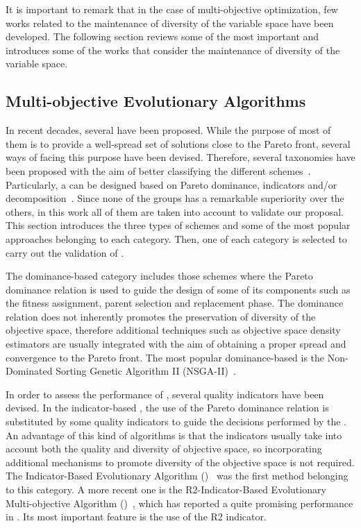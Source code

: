 It is important to remark that in the case of multi-objective optimization, few works related to the maintenance of 
diversity of the variable space have been developed.
%
The following section reviews some of the most important \MOEAS{} and introduces some of the works that consider
the maintenance of diversity of the variable space.

\subsection{Multi-objective Evolutionary Algorithms}

In recent decades, several \MOEAS{} have been proposed. 
%
While the purpose of most of them is to provide a well-spread set of solutions close to the Pareto front,
several ways of facing this purpose have been devised.
%
Therefore, several taxonomies have been proposed with the aim of better classifying the different 
schemes~\cite{Joel:BOOK_MOEAs}.
%
Particularly, a \MOEA{} can be designed based on Pareto dominance, indicators and/or decomposition~\cite{Joel:StateArt}.
%
Since none of the groups has a remarkable superiority over the others, in this work all of them are taken into account to validate
our proposal.
%
This section introduces the three types of schemes and some of the most popular approaches belonging to each category.
%
Then, one \MOEA{} of each category is selected to carry out the validation of \VSDMOEA{}.

The dominance-based category includes those schemes where the Pareto dominance relation is used to guide the 
design of some of its components such as the fitness assignment, parent selection and replacement phase.
%
The dominance relation does not inherently promotes the preservation of diversity of the objective space, 
therefore additional techniques such as objective space density estimators are usually integrated with the aim
of obtaining a proper spread and convergence to the Pareto front.
%
The most popular dominance-based \MOEA{} is the Non-Dominated Sorting Genetic Algorithm II (NSGA-II)~\cite{Joel:NSGAII}.
%

In order to assess the performance of \MOEAS{}, several quality indicators have been devised.
%
In the indicator-based \MOEAS{}, the use of the Pareto dominance relation is substituted by some quality indicators 
to guide the decisions performed by the \MOEA{}.
%
An advantage of this kind of algorithms is that the indicators usually take into account both the quality and 
diversity of objective space, so incorporating additional mechanisms to promote diversity of the objective 
space is not required.
%
The Indicator-Based Evolutionary Algorithm (\IBEA{})~\cite{Joel:IBEA} was the first method belonging to this category.
%
A more recent one is the R2-Indicator-Based Evolutionary Multi-objective Algorithm (\RMOEA{})~\cite{trautmann2013r2}, 
which has reported a quite promising performance in \MOPS{}.
%
Its most important feature is the use of the R2 indicator.

